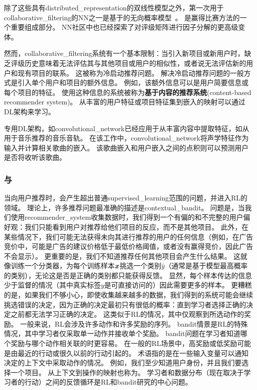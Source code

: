 
除了这些具有\gls{distributed_representation}的双线性模型之外，第一次用于\gls{collaborative_filtering}的\gls{NN}之一是基于的无向概率模型~\citep{Salakhutdinov-2007-short}。
是赢得比赛方法的一个重要组成部分\citep{BigChaos-Netflix2009,Koren09}。
\gls{NN}社区中也已经探索了对评级矩阵进行因子分解的更高级变体\citep{Salakhutdinov2008-small}。

然而，\gls{collaborative_filtering}系统有一个基本限制：当引入新项目或新用户时，缺乏评级历史意味着无法评估其与其他项目或用户的相似性，或者说无法评估新的用户和现有项目的联系。
这被称为冷启动推荐问题。
解决冷启动推荐问题的一般方式是引入单个用户和项目的额外信息。
例如，该额外信息可以是用户简要信息或每个项目的特征。
使用这种信息的系统被称为\textbf{基于内容的推荐系统}(content-based recommender system)。
从丰富的用户特征或项目特征集到嵌入的映射可以通过\gls{DL}架构来学习\citep{Huang-et-al-2013,Elkahky-et-al-2015}。

专用\gls{DL}架构，如\gls{convolutional_network}已经应用于从丰富内容中提取特征，如从用于音乐推荐的音乐音轨\citep{vandenOord-et-al-NIPS2013}。
在该工作中，\gls{convolutional_network}将声学特征作为输入并计算相关歌曲的嵌入。
该歌曲嵌入和用户嵌入之间的点积则可以预测用户是否将收听该歌曲。


\subsubsection{与}
当向用户推荐时，会产生超出普通\gls{supervised_learning}范围的问题，并进入\gls{RL}的领域。
理论上，许多推荐问题最准确的描述是\gls{contextual_bandit}\citep{Langford+Zhang-NIPS2008,Lu-et-al-2010}。
问题是，当我们使用\gls{recommender_system}收集数据时，我们得到一个有偏的和不完整的用户偏好观：我们只能看到用户对推荐给他们项目的反应，而不是其他项目。
此外，在某些情况下，我们可能无法获得未向其进行推荐的用户的任何信息（例如，在广告竞价中，可能是广告的建议价格低于最低价格阈值，或者没有赢得竞价，因此广告不会显示）。
更重要的是，我们不知道推荐任何其他项目会产生什么结果。
这就像训练一个分类器，为每个训练样本$\boldsymbol{\mathit{x}}$挑选一个类别$\hat y$（通常是基于模型最高概率的类别），无论这是否是正确的类别都只能获得反馈。
显然，每个样本传达的信息少于监督的情况（其中真实标签$y$是可直接访问的）因此需要更多的样本。
更糟糕的是，如果我们不够小心，即使收集越来越多的数据，我们得到的系统可能会继续挑选错误的决定，因为正确的决定最初只有很低的概率：直到学习者选择正确的决定之前都无法学习正确的决定。
这类似于\gls{RL}的情况，其中仅观察到所选动作的奖励。
一般来说，\gls{RL}会涉及许多动作和许多奖励的序列。
\gls{bandit}情景是\gls{RL}的特殊情况，其中学习者仅采取单一动作并接收单个奖励。
\gls{bandit}问题在学习者知道哪个奖励与哪个动作相关联的时更容易。
在一般的\gls{RL}场景中，高奖励或低奖励可能是由最近的行动或很久以前的行动引起的。
术语指的是在一些输入变量可以通知决定的上下文中采取动作的情况。
例如，我们至少知道用户身份，并且我们要选择一个项目。
从上下文到操作的映射也称为。
学习者和数据分布（现在取决于学习者的行动）之间的反馈循环是\gls{RL}和\gls{bandit}研究的中心问题。

